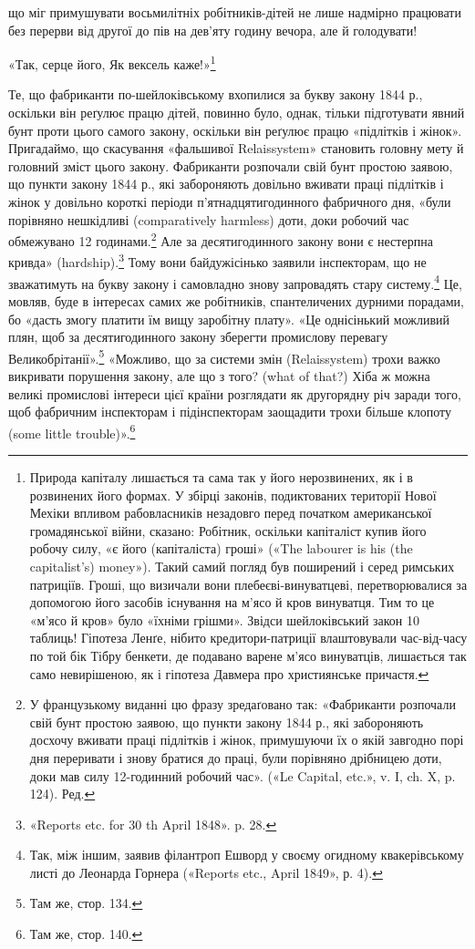 \parcont{}  %
що міг примушувати восьмилітніх робітників-дітей не лише
надмірно працювати без перерви від другої до пів на дев’яту
годину вечора, але й голодувати!

«Так, серце його,
Як вексель каже!»\footnote{
Природа капіталу лишається та сама так у його нерозвинених, як
і в розвинених його формах. У збірці законів, подиктованих території
Нової Мехіки впливом рабовласників незадовго перед початком американської
громадянської війни, сказано: Робітник, оскільки капіталіст
купив його робочу силу, «є його (капіталіста) гроші» («The labourer
is his (the capitalist's) money»). Такий самий погляд був поширений і серед
римських патриціїв. Гроші, що визичали вони плебеєві-винуватцеві,
перетворювалися за допомогою його засобів існування на м'ясо й кров
винуватця. Тим то це «м’ясо й кров» було «їхніми грішми». Звідси шейлоківський
закон 10 таблиць! Гіпотеза Ленґе, нібито кредитори-патриції
влаштовували час-від-часу по той бік Тібру бенкети, де подавано варене
м’ясо винуватців, лишається так само невирішеною, як і гіпотеза
Давмера про християнське причастя.
}

Те, що фабриканти по-шейлоківському вхопилися за букву
закону 1844 р., оскільки він реґулює працю дітей, повинно було,
однак, тільки підготувати явний бунт проти цього самого закону,
оскільки він реґулює працю «підлітків і жінок». Пригадаймо, що
скасування «фальшивої Relaissystem» становить головну мету
й головний зміст цього закону. Фабриканти розпочали свій бунт
простою заявою, що пункти закону 1844 р., які забороняють довільно
вживати праці підлітків і жінок у довільно короткі
періоди п’ятнадцятигодинного фабричного дня, «були порівняно
нешкідливі (comparatively harmless) доти, доки робочий час
обмежувано 12 годинами.\footnote*{
У французькому виданні цю фразу зредаґовано так: «Фабриканти
розпочали свій бунт простою заявою, що пункти закону 1844 р., які забороняють
досхочу вживати праці підлітків і жінок, примушуючи їх о якій
завгодно порі дня переривати і знову братися до праці, були порівняно
дрібницею доти, доки мав силу 12-годинний робочий час». («Le Capital,
etc.», v. I, ch. X, p. 124). Ред.
} Але за десятигодинного закону вони
є нестерпна кривда» (hardship).\footnote{
«Reports etc. for 30 th April 1848». p. 28.
} Тому вони байдужісінько
заявили інспекторам, що не зважатимуть на букву закону і
самовладно знову запровадять стару систему.\footnote{
Так, між іншим, заявив філантроп Ешворд у своєму огидному
квакерівському листі до Леонарда Горнера («Reports etc., April 1849»,
р. 4).
} Це, мовляв,
буде в інтересах самих же робітників, спантеличених дурними
порадами, бо «дасть змогу платити їм вищу заробітну плату».
«Це однісінький можливий плян, щоб за десятигодинного закону
зберегти промислову перевагу Великобрітанії».\footnote{
Там же, стор. 134.
} «Можливо,
що за системи змін (Relaissystem) трохи важко викривати порушення
закону, але що з того? (what of that?) Хіба ж можна
великі промислові інтереси цієї країни розглядати як другорядну
річ заради того, щоб фабричним інспекторам і підінспекторам
заощадити трохи більше клопоту (some little trouble)».\footnote{
Там же, стор. 140.
}
